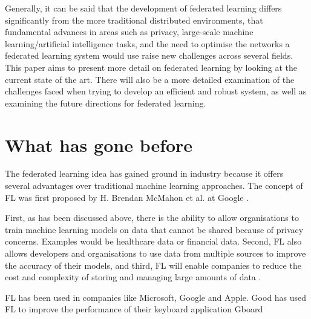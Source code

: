 \documentclass[conference]{IEEEtran}
\begin{document}
Generally, it can be said that the development of federated learning differs significantly from the more traditional distributed environments, that fundamental advances in areas such as privacy, large-scale machine learning/artificial intelligence tasks, and the need to optimise the networks a federated learning system would use raise new challenges across several fields. \\
This paper aims to present more detail on federated learning by looking at the current state of the art. There will also be a more detailed examination of the challenges faced when trying to develop an efficient and robust system, as well as examining the future directions for federated learning. 

\section{What has gone before}
The federated learning idea has gained ground in industry because it offers several advantages over traditional machine learning approaches. The concept of FL was first proposed by H. Brendan McMahon et al. at Google \cite{b4}. 

First, as has been discussed above, there is the ability to allow organisations to train machine learning models on data that cannot be shared because of privacy concerns. Examples would be healthcare data or financial data. Second, FL also allows developers and organisations to use data from multiple sources to improve the accuracy of their models, and third, FL will enable companies to reduce the cost and complexity of storing and managing large amounts of data \cite{b3}.

FL has been used in companies like Microsoft, Google and Apple. Good has used FL to improve the performance of their keyboard application Gboard

\end{document}
